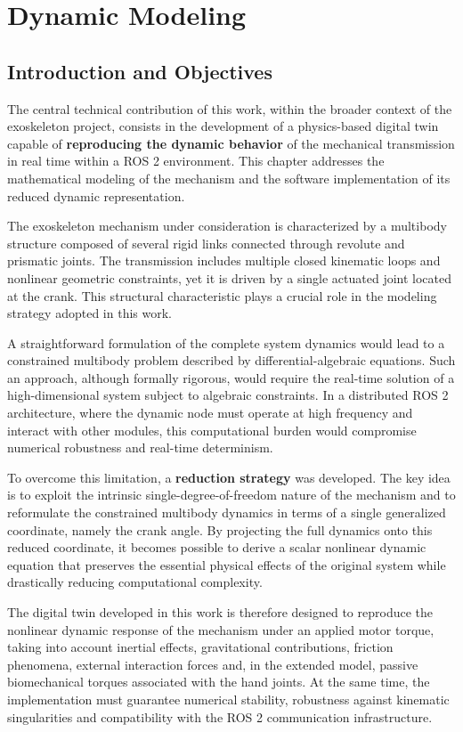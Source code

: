 \chapter{Dynamic Modeling}
\section{Introduction and Objectives}
The central technical contribution of this work, within the broader context of the exoskeleton project, consists in the development of a physics-based digital twin capable of \textbf{reproducing the dynamic behavior} of the mechanical transmission in real time within a ROS 2 environment. This chapter addresses the mathematical modeling of the mechanism and the software implementation of its reduced dynamic representation.

The exoskeleton mechanism under consideration is characterized by a multibody structure composed of several rigid links connected through revolute and prismatic joints. The transmission includes multiple closed kinematic loops and nonlinear geometric constraints, yet it is driven by a single actuated joint located at the crank. This structural characteristic plays a crucial role in the modeling strategy adopted in this work.

A straightforward formulation of the complete system dynamics would lead to a constrained multibody problem described by differential-algebraic equations. Such an approach, although formally rigorous, would require the real-time solution of a high-dimensional system subject to algebraic constraints. In a distributed ROS 2 architecture, where the dynamic node must operate at high frequency and interact with other modules, this computational burden would compromise numerical robustness and real-time determinism.

To overcome this limitation, a \textbf{reduction strategy} was developed. The key idea is to exploit the intrinsic single-degree-of-freedom nature of the mechanism and to reformulate the constrained multibody dynamics in terms of a single generalized coordinate, namely the crank angle. By projecting the full dynamics onto this reduced coordinate, it becomes possible to derive a scalar nonlinear dynamic equation that preserves the essential physical effects of the original system while drastically reducing computational complexity.

The digital twin developed in this work is therefore designed to reproduce the nonlinear dynamic response of the mechanism under an applied motor torque, taking into account inertial effects, gravitational contributions, friction phenomena, external interaction forces and, in the extended model, passive biomechanical torques associated with the hand joints. At the same time, the implementation must guarantee numerical stability, robustness against kinematic singularities and compatibility with the ROS 2 communication infrastructure.

